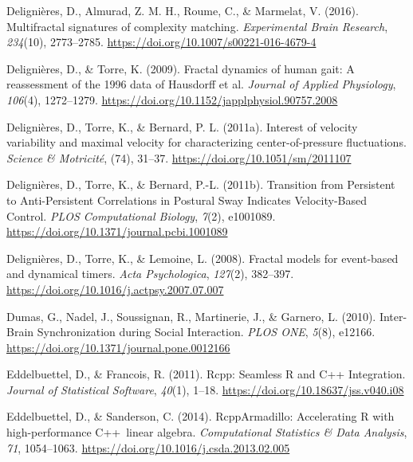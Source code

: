 \documentclass[
  man]{apa6}
\newlength{\cslhangindent}
\newlength{\cslentryspacingunit} %
\newenvironment{CSLReferences}[2] %
 {%
  \setlength{\parindent}{0pt}
  \ifodd #1
  \let\oldpar\par
  \def\par{\hangindent=\cslhangindent\oldpar}
  \fi
  \setlength{\parskip}{#2\cslentryspacingunit}
 }%
 {}
\begin{document}
\begin{CSLReferences}{1}{0}
\leavevmode{}%
Delignières, D., Almurad, Z. M. H., Roume, C., \& Marmelat, V. (2016). Multifractal signatures of complexity matching. \emph{Experimental Brain Research}, \emph{234}(10), 2773--2785. \url{https://doi.org/10.1007/s00221-016-4679-4}

\leavevmode{}%
Delignières, D., \& Torre, K. (2009). Fractal dynamics of human gait: A reassessment of the 1996 data of {Hausdorff} et al. \emph{Journal of Applied Physiology}, \emph{106}(4), 1272--1279. \url{https://doi.org/10.1152/japplphysiol.90757.2008}

\leavevmode{}%
Delignières, D., Torre, K., \& Bernard, P. L. (2011a). Interest of velocity variability and maximal velocity for characterizing center-of-pressure fluctuations. \emph{Science \& Motricité}, (74), 31--37. \url{https://doi.org/10.1051/sm/2011107}

\leavevmode{}%
Delignières, D., Torre, K., \& Bernard, P.-L. (2011b). Transition from {Persistent} to {Anti}-{Persistent} {Correlations} in {Postural} {Sway} {Indicates} {Velocity}-{Based} {Control}. \emph{PLOS Computational Biology}, \emph{7}(2), e1001089. \url{https://doi.org/10.1371/journal.pcbi.1001089}

\leavevmode{}%
Delignières, D., Torre, K., \& Lemoine, L. (2008). Fractal models for event-based and dynamical timers. \emph{Acta Psychologica}, \emph{127}(2), 382--397. \url{https://doi.org/10.1016/j.actpsy.2007.07.007}

\leavevmode{}%
Dumas, G., Nadel, J., Soussignan, R., Martinerie, J., \& Garnero, L. (2010). Inter-{Brain} {Synchronization} during {Social} {Interaction}. \emph{PLOS ONE}, \emph{5}(8), e12166. \url{https://doi.org/10.1371/journal.pone.0012166}

\leavevmode{}%
Eddelbuettel, D., \& Francois, R. (2011). Rcpp: {Seamless} {R} and {C}++ {Integration}. \emph{Journal of Statistical Software}, \emph{40}(1), 1--18. \url{https://doi.org/10.18637/jss.v040.i08}

\leavevmode{}%
Eddelbuettel, D., \& Sanderson, C. (2014). {RcppArmadillo}: {Accelerating} {R} with high-performance {C}++~linear algebra. \emph{Computational Statistics \& Data Analysis}, \emph{71}, 1054--1063. \url{https://doi.org/10.1016/j.csda.2013.02.005}


\end{CSLReferences}
\end{document}
